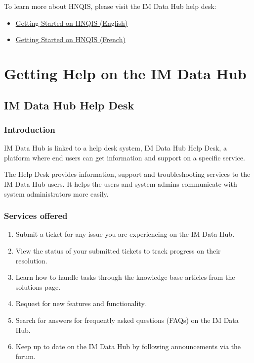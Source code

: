\documentclass[]{book}
\providecommand{\tightlist}{%
  \setlength{\itemsep}{0pt}\setlength{\parskip}{0pt}}
\begin{document}
To learn more about HNQIS, please visit the IM Data Hub help desk:

\begin{itemize}
\tightlist
\item
  \href{https://imdatahub.freshdesk.com/en/support/solutions/articles/47001032548-getting-started-on-hnqis}{Getting Started on HNQIS (English)}
\item
  \href{https://imdatahub.freshdesk.com/fr/support/solutions/articles/47001032548-getting-started-on-hnqis}{Getting Started on HNQIS (French)}
\end{itemize}

\hypertarget{trouble}{%
\chapter{Getting Help on the IM Data Hub}\label{trouble}}

\hypertarget{im-data-hub-help-desk}{%
\section{IM Data Hub Help Desk}\label{im-data-hub-help-desk}}

\hypertarget{introduction-5}{%
\subsection{Introduction}\label{introduction-5}}

IM Data Hub is linked to a help desk system, IM Data Hub Help Desk, a platform where end users can get information and support on a specific service.

The Help Desk provides information, support and troubleshooting services to the IM Data Hub users. It helps the users and system admins communicate with system administrators more easily.

\hypertarget{services-offered}{%
\subsection{Services offered}\label{services-offered}}

\begin{enumerate}
\def\labelenumi{\arabic{enumi}.}
\tightlist
\item
  Submit a ticket for any issue you are experiencing on the IM Data Hub.
\item
  View the status of your submitted tickets to track progress on their resolution.\\
\item
  Learn how to handle tasks through the knowledge base articles from the solutions page.
\item
  Request for new features and functionality.
\item
  Search for answers for frequently asked questions (FAQs) on the IM Data Hub.
\item
  Keep up to date on the IM Data Hub by following announcements via the forum.
\end{enumerate}
\end{document}
